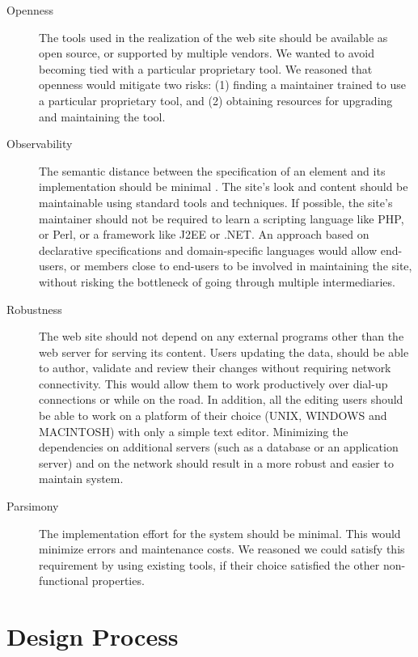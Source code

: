 \documentclass[10pt]{article}
\begin{document}
\begin{description}
\item[Openness] The tools used in the realization of the web site
should be available as open source, or supported by multiple vendors.
We wanted to avoid becoming tied with a particular proprietary
tool.
We reasoned that openness would mitigate two risks:
(1) finding a maintainer trained to use a particular proprietary tool,
and (2) obtaining resources for upgrading and maintaining the tool.

\item[Observability]
The semantic distance between
the specification of an element and its implementation 
should be minimal \cite{SG97}.
The site's look and content should be maintainable
using standard tools and techniques.
If possible, the site's maintainer should not be required to
learn a scripting language like {\sc PHP}, or {\sc Perl}, or
a framework like {\sc J2EE} or {\sc .NET}.
An approach based on declarative specifications \cite{FFLS00} and
domain-specific languages \cite{DKV00} \cite{Spi00b} would allow end-users, or members
close to end-users to be involved in maintaining the site,
without risking the bottleneck of going through
multiple intermediaries.

\item[Robustness] The web site should not depend on
any external programs other than the web server for serving
its content.
Users updating the data, should be able to author, validate and 
review their changes without requiring network connectivity.
This would allow them to work productively over dial-up connections
or while on the road. In addition, all the editing users should be able 
to work on a platform of their choice ({\sc UNIX}, {\sc WINDOWS} and {\sc MACINTOSH}) 
with only a simple text editor.
Minimizing the dependencies on additional servers (such as a
database or an application server) and on the network
should result in a more robust and easier to maintain system.   

\item[Parsimony] The implementation effort for
the system should be minimal.
This would minimize errors and maintenance costs.
We reasoned we could satisfy this requirement by
using existing tools, if their choice satisfied the
other non-functional properties.
\end{description} 

\section{Design Process}
\end{document}
